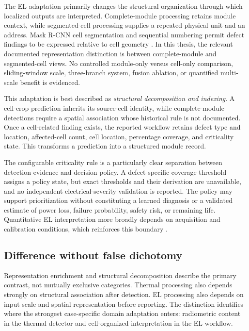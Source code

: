 \documentclass[12pt,a4paper]{report}
\begin{document}
The EL adaptation primarily changes the structural organization through which localized outputs are interpreted. Complete-module processing retains module context, while segmented-cell processing supplies a repeated physical unit and an address. Mask R-CNN cell segmentation and sequential numbering permit defect findings to be expressed relative to cell geometry \citep{src002}. In this thesis, the relevant documented representation distinction is between complete-module and segmented-cell views. No controlled module-only versus cell-only comparison, sliding-window scale, three-branch system, fusion ablation, or quantified multi-scale benefit is evidenced.

This adaptation is best described as \emph{structural decomposition and indexing}. A cell-crop prediction inherits its source-cell identity, while complete-module detections require a spatial association whose historical rule is not documented. Once a cell-related finding exists, the reported workflow retains defect type and location, affected-cell count, cell location, percentage coverage, and criticality state. This transforms a prediction into a structured module record.

The configurable criticality rule is a particularly clear separation between detection evidence and decision policy. A defect-specific coverage threshold assigns a policy state, but exact thresholds and their derivation are unavailable, and no independent electrical-severity validation is reported. The policy may support prioritization without constituting a learned diagnosis or a validated estimate of power loss, failure probability, safety risk, or remaining life. Quantitative EL interpretation more broadly depends on acquisition and calibration conditions, which reinforces this boundary \citep{src019}.

\subsection{Difference without false dichotomy}

Representation enrichment and structural decomposition describe the primary contrast, not mutually exclusive categories. Thermal processing also depends strongly on structural association after detection. EL processing also depends on input scale and spatial representation before reporting. The distinction identifies where the strongest case-specific domain adaptation enters: radiometric content in the thermal detector and cell-organized interpretation in the EL workflow.
\end{document}
